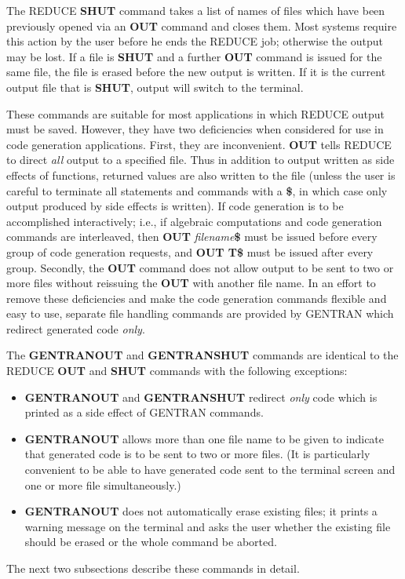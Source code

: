 The REDUCE {\bf SHUT} command takes a list of names of files which
have been previously opened via an {\bf OUT} command and closes them.
Most systems require this action by the user before he ends the REDUCE
job; otherwise the output may be lost.  If a file is {\bf SHUT} and a
further {\bf OUT} command is issued for the same file, the file is
erased before the new output is written.  If it is the current output
file that is {\bf SHUT}, output will switch to the terminal.

These commands are suitable for most applications in which REDUCE
output must be saved.  However, they have two deficiencies when
considered for use in code generation applications.  First, they are
inconvenient.  {\bf OUT} tells REDUCE to direct {\it all\/} output to
a specified file.  Thus in addition to output written as side effects
of functions, returned values are also written to the file (unless the
user is careful to terminate all statements and commands with a {\bf
\$}, in which case only output produced by side effects is written).
If code generation is to be accomplished interactively; i.e., if
algebraic computations and code generation commands are interleaved,
then {\bf OUT} {\it filename\/}{\bf \$} must be issued before every
group of code generation requests, and {\bf OUT T\$} must be issued
after every group.  Secondly, the {\bf OUT} command does not allow
output to be sent to two or more files without reissuing the {\bf OUT}
with another file name.  In an effort to remove these deficiencies and
make the code generation commands flexible and easy to use, separate
file handling commands are provided by GENTRAN which redirect
generated code {\it only}.

 
The {\bf GENTRANOUT} and {\bf GENTRANSHUT} commands are identical to
the REDUCE {\bf OUT} and {\bf SHUT} commands with the following
exceptions:

\begin{itemize}
\item {\bf GENTRANOUT} and {\bf GENTRANSHUT} redirect {\it only\/} code which
is printed as a side effect of GENTRAN commands.
\item {\bf GENTRANOUT} allows more than one file name to be given
to indicate that generated code is to be sent to two or more
files.  (It is particularly convenient to be able to
have generated code sent to
the terminal screen and one or more file simultaneously.)
\item {\bf GENTRANOUT} does not automatically erase existing files; it prints
a warning message on the terminal and asks the user whether the existing
file should be erased or the whole command be aborted.
\end{itemize}
The next two subsections describe these commands in detail.


